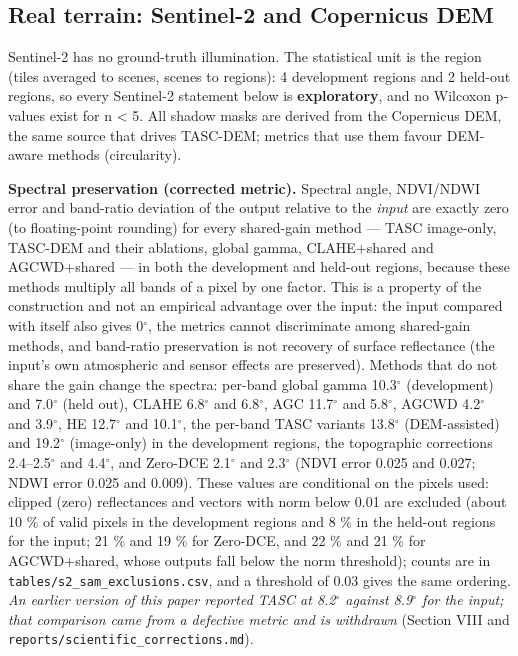 \documentclass[conference]{IEEEtran}
\begin{document}
\subsection{Real terrain: Sentinel-2 and Copernicus DEM}
Sentinel-2 has no ground-truth illumination. The statistical unit is the region (tiles averaged to scenes, scenes to regions): 4 development regions and 2 held-out regions, so every Sentinel-2 statement below is \textbf{exploratory}, and no Wilcoxon p-values exist for n < 5. All shadow masks are derived from the Copernicus DEM, the same source that drives TASC-DEM; metrics that use them favour DEM-aware methods (circularity).

\textbf{Spectral preservation (corrected metric).} Spectral angle, NDVI/NDWI error and band-ratio deviation of the output relative to the \emph{input} are exactly zero (to floating-point rounding) for every shared-gain method --- TASC image-only, TASC-DEM and their ablations, global gamma, CLAHE+shared and AGCWD+shared --- in both the development and held-out regions, because these methods multiply all bands of a pixel by one factor. This is a property of the construction and not an empirical advantage over the input: the input compared with itself also gives 0$^{\circ}$, the metrics cannot discriminate among shared-gain methods, and band-ratio preservation is not recovery of surface reflectance (the input's own atmospheric and sensor effects are preserved). Methods that do not share the gain change the spectra: per-band global gamma 10.3$^{\circ}$ (development) and 7.0$^{\circ}$ (held out), CLAHE 6.8$^{\circ}$ and 6.8$^{\circ}$, AGC 11.7$^{\circ}$ and 5.8$^{\circ}$, AGCWD 4.2$^{\circ}$ and 3.9$^{\circ}$, HE 12.7$^{\circ}$ and 10.1$^{\circ}$, the per-band TASC variants 13.8$^{\circ}$ (DEM-assisted) and 19.2$^{\circ}$ (image-only) in the development regions, the topographic corrections 2.4--2.5$^{\circ}$ and 4.4$^{\circ}$, and Zero-DCE 2.1$^{\circ}$ and 2.3$^{\circ}$ (NDVI error 0.025 and 0.027; NDWI error 0.025 and 0.009). These values are conditional on the pixels used: clipped (zero) reflectances and vectors with norm below 0.01 are excluded (about 10 \% of valid pixels in the development regions and 8 \% in the held-out regions for the input; 21 \% and 19 \% for Zero-DCE, and 22 \% and 21 \% for AGCWD+shared, whose outputs fall below the norm threshold); counts are in \texttt{tables/s2\_sam\_exclusions.csv}, and a threshold of 0.03 gives the same ordering. \emph{An earlier version of this paper reported TASC at 8.2$^{\circ}$ against 8.9$^{\circ}$ for the input; that comparison came from a defective metric and is withdrawn} (Section VIII and \texttt{reports/scientific\_corrections.md}).
\end{document}
